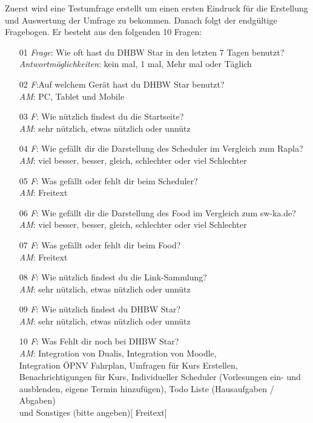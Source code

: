 Zuerst wird eine Testumfrage erstellt um einen ersten Eindruck für die Erstellung und Auswertung der Umfrage zu bekommen.
Danach folgt der endgültige Fragebogen. Er besteht aus den folgenden 10 Fragen:
\begin{itemize}
	\item[01] {\emph{Frage}: Wie oft hast du DHBW Star in den letzten 7 Tagen benutzt?\\
		\emph{Antwortmöglichkeiten}: kein mal, 1 mal, Mehr mal oder Täglich}
	\item[02]{\emph{F}:Auf welchem Gerät hast du DHBW Star benutzt?\\
		\emph{AM}: PC, Tablet und Mobile}
	\item[03]{\emph{F}: Wie nützlich findest du die Startseite?\\
		\emph{AM}: sehr nützlich, etwas nützlich oder unnütz}
	\item[04]{\emph{F}: Wie gefällt dir die Darstellung des Scheduler im Vergleich zum Rapla?\\
		\emph{AM}: viel besser, besser, gleich, schlechter oder viel Schlechter}
	\item[05]{\emph{F}: Was gefällt oder fehlt dir beim Scheduler?\\
		\emph{AM}: Freitext}
	\item[06]{\emph{F}: Wie gefällt dir die Darstellung des Food im Vergleich zum sw-ka.de?\\
		\emph{AM}: viel besser, besser, gleich, schlechter oder viel Schlechter}
	\item[07]{\emph{F}: Was gefällt oder fehlt dir beim Food?\\
		\emph{AM}: Freitext}
	\item[08]{\emph{F}: Wie nützlich findest du die Link-Sammlung?\\
		\emph{AM}: sehr nützlich, etwas nützlich oder unnütz}
	\item[09]{\emph{F}: Wie nützlich findest du DHBW Star?\\
		\emph{AM}: sehr nützlich, etwas nützlich oder unnütz}
	\item[10]{\emph{F}: Was Fehlt dir noch bei DHBW Star?\\
		\emph{AM}: Integration von Dualis, Integration von Moodle,\\ Integration ÖPNV Fahrplan, Umfragen für Kurs Erstellen,\\ Benachrichtigungen für Kurs, Individueller Scheduler (Vorlesungen ein- und ausblenden, eigene Termin hinzufügen), Todo Liste (Hausaufgaben / Abgaben)\\ und Sonstiges (bitte angeben)[ Freitext]}
\end{itemize}
